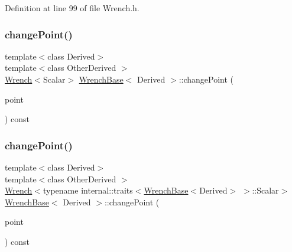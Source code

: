 Definition at line 99 of file Wrench.\+h.

\hypertarget{class_wrench_base_a485dd3f045ae5e8f6709efb4c9e9dd2c}{}\label{class_wrench_base_a485dd3f045ae5e8f6709efb4c9e9dd2c} 
\subsubsection{\texorpdfstring{change\+Point()}{changePoint()}\hspace{0.1cm}{\footnotesize\ttfamily [1/2]}}
{\footnotesize\ttfamily template$<$class Derived$>$ \\
template$<$class Other\+Derived $>$ \\
\hyperlink{class_wrench}{Wrench}$<$Scalar$>$ \hyperlink{class_wrench_base}{Wrench\+Base}$<$ Derived $>$\+::change\+Point (\begin{DoxyParamCaption}\item[{const Matrix\+Base$<$ Other\+Derived $>$ \&}]{point }\end{DoxyParamCaption}) const\hspace{0.3cm}{\ttfamily [inline]}}

\hypertarget{class_wrench_base_ae0f1aceb90c2cd1e09d83e24462b6ce7}{}\label{class_wrench_base_ae0f1aceb90c2cd1e09d83e24462b6ce7} 
\subsubsection{\texorpdfstring{change\+Point()}{changePoint()}\hspace{0.1cm}{\footnotesize\ttfamily [2/2]}}
{\footnotesize\ttfamily template$<$class Derived$>$ \\
template$<$class Other\+Derived $>$ \\
\hyperlink{class_wrench}{Wrench}$<$typename internal\+::traits$<$\hyperlink{class_wrench_base}{Wrench\+Base}$<$Derived$>$ $>$\+::Scalar$>$ \hyperlink{class_wrench_base}{Wrench\+Base}$<$ Derived $>$\+::change\+Point (\begin{DoxyParamCaption}\item[{const Matrix\+Base$<$ Other\+Derived $>$ \&}]{point }\end{DoxyParamCaption}) const\hspace{0.3cm}{\ttfamily [inline]}}



